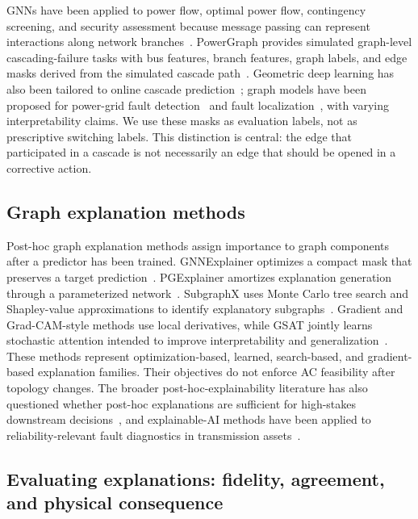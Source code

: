 GNNs have been applied to power flow, optimal power flow, contingency screening, and security assessment because message passing can represent interactions along network branches~\citep{liao2022,su2023,ngo2024}. PowerGraph provides simulated graph-level cascading-failure tasks with bus features, branch features, graph labels, and edge masks derived from the simulated cascade path~\citep{varbella2024,varbella2023}. Geometric deep learning has also been tailored to online cascade prediction~\citep{varbella2023gdl}; graph models have been proposed for power-grid fault detection~\citep{bosso2025} and fault localization~\citep{gjorgiev2023}, with varying interpretability claims. We use these masks as evaluation labels, not as prescriptive switching labels. This distinction is central: the edge that participated in a cascade is not necessarily an edge that should be opened in a corrective action.

\subsection{Graph explanation methods}\label{graph_explanation_methods}

Post-hoc graph explanation methods assign importance to graph components after a predictor has been trained. GNNExplainer optimizes a compact mask that preserves a target prediction~\citep{ying2019}. PGExplainer amortizes explanation generation through a parameterized network~\citep{luo2020}. SubgraphX uses Monte Carlo tree search and Shapley-value approximations to identify explanatory subgraphs~\citep{yuan2021}. Gradient and Grad-CAM-style methods use local derivatives, while GSAT jointly learns stochastic attention intended to improve interpretability and generalization~\citep{miao2022}. These methods represent optimization-based, learned, search-based, and gradient-based explanation families. Their objectives do not enforce AC feasibility after topology changes. The broader post-hoc-explainability literature has also questioned whether post-hoc explanations are sufficient for high-stakes downstream decisions~\citep{longo2024,rudin2019}, and explainable-AI methods have been applied to reliability-relevant fault diagnostics in transmission assets~\citep{hsu2025}.

\subsection{Evaluating explanations: fidelity, agreement, and physical consequence}\label{physics_aware_explanation_evaluation}

